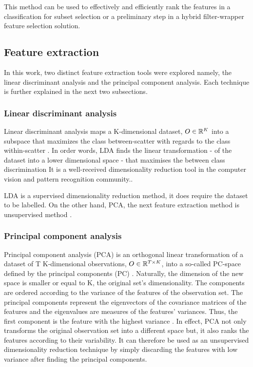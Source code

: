 This method can be used to effectively and efficiently rank the features in a classification for subset selection or a preliminary step in a hybrid filter-wrapper feature selection solution.  

\subsection{Feature extraction}
In this work, two distinct feature extraction tools were explored namely, the linear discriminant analysis and the principal component analysis.
Each technique is further explained in the next two subsections.
 
\subsubsection{Linear discriminant analysis}
Linear discriminant analysis maps a K-dimensional dataset, \(O \in \Bbb R^{K}\) into a subspace that maximizes the class between-scatter with regards to the class within-scatter \cite{prtool}.
In order words, LDA finds the linear transformation - of the dataset into a lower dimensional space - that maximises the between class discrimination \cite{lda2015}
It is a well-received dimensionality reduction tool in the computer vision and pattern recognition community.\cite{lda2015}.

 LDA is a supervised dimensionality reduction method, it does require the dataset to be labelled. On the other hand, PCA, the next feature extraction method is unsupervised method \cite{prtool}.
 
\subsubsection{Principal component analysis}
 Principal component analysis (PCA) is an orthogonal linear transformation of a dataset of T K-dimensional observations, \(O \in \Bbb R^{T\times K}\), into a so-called PC-space defined by the principal components (PC) \cite{dime2017}.
 Naturally, the dimension of the new space is smaller or equal to K, the original set's dimensionality. The components are ordered according to the variance of the features of the observation set. The principal components represent the eigenvectors of the covariance matrices of the features and the eigenvalues are measures of the features' variances. Thus, the first component is the feature with the highest variance \cite{dime2017}.
 In effect, PCA not only transforms the original observation set into a different space but, it also ranks the features according to their variability. It can therefore be used as an unsupervised dimensionality reduction technique by simply discarding the features with low variance after finding the principal components.